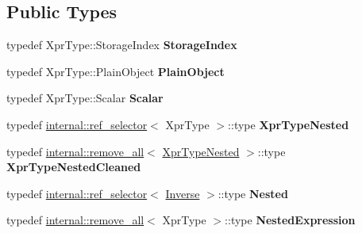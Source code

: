 \subsection*{Public Types}
\begin{DoxyCompactItemize}
\item 
\mbox{\label{class_eigen_1_1_inverse_a24a2e9d42e51ebbfebb19abf69189277}} 
typedef Xpr\+Type\+::\+Storage\+Index {\bfseries Storage\+Index}
\item 
\mbox{\label{class_eigen_1_1_inverse_a43944177f0ff3b1674204d5ee7e9ccb3}} 
typedef Xpr\+Type\+::\+Plain\+Object {\bfseries Plain\+Object}
\item 
\mbox{\label{class_eigen_1_1_inverse_aec6048fd8cc031a99b0f458841b3811f}} 
typedef Xpr\+Type\+::\+Scalar {\bfseries Scalar}
\item 
\mbox{\label{class_eigen_1_1_inverse_a0c69f9e9bc52018fe6a3dec47d363066}} 
typedef \mbox{\hyperlink{struct_eigen_1_1internal_1_1ref__selector}{internal\+::ref\+\_\+selector}}$<$ Xpr\+Type $>$\+::type {\bfseries Xpr\+Type\+Nested}
\item 
\mbox{\label{class_eigen_1_1_inverse_a9785bc56c3c90a9435d6248d2706b17c}} 
typedef \mbox{\hyperlink{struct_eigen_1_1internal_1_1remove__all}{internal\+::remove\+\_\+all}}$<$ \mbox{\hyperlink{struct_eigen_1_1internal_1_1true__type}{Xpr\+Type\+Nested}} $>$\+::type {\bfseries Xpr\+Type\+Nested\+Cleaned}
\item 
\mbox{\label{class_eigen_1_1_inverse_a47767cc8b6793334f19aa67834191bc5}} 
typedef \mbox{\hyperlink{struct_eigen_1_1internal_1_1ref__selector}{internal\+::ref\+\_\+selector}}$<$ \mbox{\hyperlink{class_eigen_1_1_inverse}{Inverse}} $>$\+::type {\bfseries Nested}
\item 
\mbox{\label{class_eigen_1_1_inverse_a35e730de4de44f631213d25001e3edc3}} 
typedef \mbox{\hyperlink{struct_eigen_1_1internal_1_1remove__all}{internal\+::remove\+\_\+all}}$<$ Xpr\+Type $>$\+::type {\bfseries Nested\+Expression}
\end{DoxyCompactItemize}
